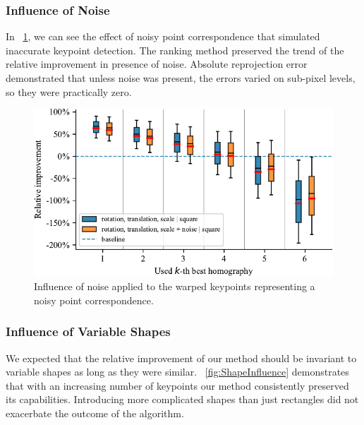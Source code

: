 \subsubsection{Influence of Noise}

In \figstr{}~\ref{fig:NoiseInfluence}, we can see the effect of noisy point correspondence that simulated inaccurate keypoint detection. The ranking method preserved the trend of the relative improvement in presence of noise. Absolute reprojection error demonstrated that unless noise was present, the errors varied on sub-pixel levels, so they were practically zero.

\begin{figure}[t]
    \centering
    \includegraphics[width=\boxplotimgwidth]{figures/homography/noise_influence.pdf}
    \caption[Influence of noise]{Influence of noise applied to the warped keypoints representing a noisy point correspondence.}
    \label{fig:NoiseInfluence}
\end{figure}

\subsubsection{Influence of Variable Shapes}

We expected that the relative improvement of our method should be invariant to variable shapes as long as they were similar. \figstr{}~\ref{fig:ShapeInfluence} demonstrates that with an increasing number of keypoints our method consistently preserved its capabilities. Introducing more complicated shapes than just rectangles did not exacerbate the outcome of the algorithm.

